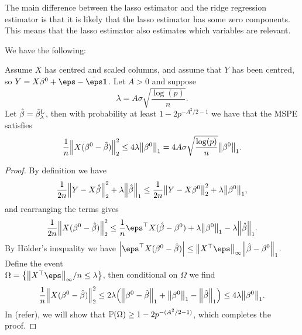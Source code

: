 The main difference between the lasso estimator and the ridge regression estimator is that it is likely that the lasso estimator has some zero components. This means that the lasso estimator also estimates which variables are relevant. 

We have the following:
\begin{theorem}
	Assume $X$ has centred and scaled columns, and assume that $Y$ has been centred, so $Y = X\beta^0 + \eps - \bar\eps \vec 1$. Let $A > 0$ and suppose
	\[
	\lambda = A\sigma\sqrt{\frac{\log(p)}{n}}.
	\]
	Let $\hat\beta = \hat\beta_\lambda^\mathrm{L}$, then with probability at least $1 - 2p^{-A^2/2 - 1}$ we have that the MSPE satisfies
	\[
	\frac1n \norm{X(\beta^0 - \hat\beta)}_2^2 \leq 4\lambda \norm{\beta^0}_1 = 4A\sigma\sqrt{\frac{\log(p)}{n}} \norm{\beta^0}_1. 
	\]
\end{theorem}

\begin{proof}
	By definition we have
	\[
	\frac1{2n}\norm{Y - X\hat\beta }_2^2 + \lambda \norm{\hat \beta}_1 \leq \frac1{2n}\norm{Y - X\beta^0}_2^2 + \lambda \norm{\beta^0}_1,
	\]
	and rearranging the terms gives
	\[
	\frac1{2n} \norm{X(\beta^0 - \hat\beta)}_2^2 \leq\frac1n \eps\T X (\hat\beta - \beta^0) + \lambda\norm{\beta^0}_1 - \lambda \norm{\hat\beta}_1. 
	\]
	By H\"older's inequality we have $\abs{\eps\T X(\beta^0 - \hat\beta)} \leq \norm{X\T\eps}_\infty \norm{\hat\beta - \beta^0}_1$. 
	Define the event \\ $\Omega = \qty{\norm{X\T\eps}_\infty/n \leq \lambda}$, then conditional on $\Omega$ we find
	\[
	\frac1{n} \norm{X(\beta^0 - \hat\beta)}_2^2 \leq 2\lambda \qty(\norm{\beta^0 - \hat\beta}_1 + \norm{\beta^0}_1 - \norm{\hat\beta}_1) \leq 4\lambda \norm{\beta^0}_1.
	\]
	In (\TODO refer), we will show that $\mathbb P(\Omega) \geq 1 - 2p^{-(A^2/2 - 1)}$, which completes the proof. 
\end{proof}